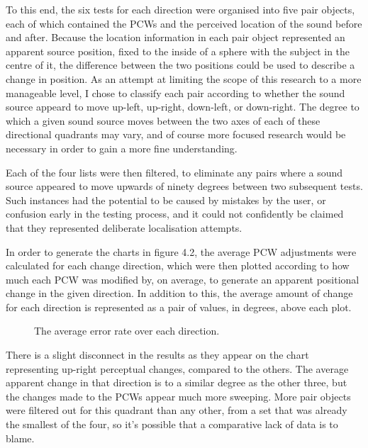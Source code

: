 To this end, the six tests for each direction were organised into five pair objects, each of which contained the PCWs and the perceived location of the sound before and after. Because the location information in each pair object represented an apparent source position, fixed to the inside of a sphere with the subject in the centre of it, the difference between the two positions could be used to describe a change in position. As an attempt at limiting the scope of this research to a more manageable level, I chose to classify each pair according to whether the sound source appeard to move up-left, up-right, down-left, or down-right. The degree to which a given sound source moves between the two axes of each of these directional quadrants may vary, and of course more focused research would be necessary in order to gain a more fine understanding. 

Each of the four lists were then filtered, to eliminate any pairs where a sound source appeared to move upwards of ninety degrees between two subsequent tests. Such instances had the potential to be caused by mistakes by the user, or confusion early in the testing process, and it could not confidently be claimed that they represented deliberate localisation attempts. 

In order to generate the charts in figure 4.2, the average PCW adjustments were calculated for each change direction, which were then plotted according to how much each PCW was modified by, on average, to generate an apparent positional change in the given direction. In addition to this, the average amount of change for each direction is represented as a pair of values, in degrees, above each plot.

\begin{figure}
	\caption{The average error rate over each direction.}
\end{figure}

There is a slight disconnect in the results as they appear on the chart representing up-right perceptual changes, compared to the others. The average apparent change in that direction is to a similar degree as the other three, but the changes made to the PCWs appear much more sweeping. More pair objects were filtered out for this quadrant than any other, from a set that was already the smallest of the four, so it's possible that a comparative lack of data is to blame. 

